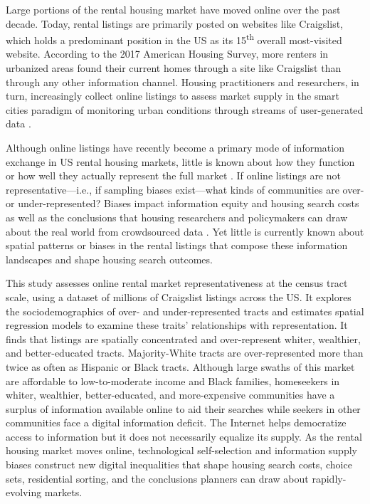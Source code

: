 \documentclass[11pt,letterpaper]{article}
\begin{document}
Large portions of the rental housing market have moved online over the past decade. Today, rental listings are primarily posted on websites like Craigslist, which holds a predominant position in the US as its 15\textsuperscript{th} overall most-visited website. According to the 2017 American Housing Survey, more renters in urbanized areas found their current homes through a site like Craigslist than through any other information channel. Housing practitioners and researchers, in turn, increasingly collect online listings to assess market supply in the smart cities paradigm of monitoring urban conditions through streams of user-generated data \citep{boeing_spot_2019,hu_monitoring_2019}.

Although online listings have recently become a primary mode of information exchange in US rental housing markets, little is known about how they function or how well they actually represent the full market \citep{boeing_new_2017,schachter_immigration_2017,besbris_language_2018}. If online listings are not representative---i.e., if sampling biases exist---what kinds of communities are over- or under-represented? Biases impact information equity and housing search costs as well as the conclusions that housing researchers and policymakers can draw about the real world from crowdsourced data \citep{mclaughlin_data_2018,arribas-bel_use_2018,folch_fast_2018,narayanan_toward_2019}. Yet little is currently known about spatial patterns or biases in the rental listings that compose these information landscapes and shape housing search outcomes.

This study assesses online rental market representativeness at the census tract scale, using a dataset of millions of Craigslist listings across the US. It explores the sociodemographics of over- and under-represented tracts and estimates spatial regression models to examine these traits' relationships with representation. It finds that listings are spatially concentrated and over-represent whiter, wealthier, and better-educated tracts. Majority-White tracts are over-represented more than twice as often as Hispanic or Black tracts. Although large swaths of this market are affordable to low-to-moderate income and Black families, homeseekers in whiter, wealthier, better-educated, and more-expensive communities have a surplus of information available online to aid their searches while seekers in other communities face a digital information deficit. The Internet helps democratize access to information but it does not necessarily equalize its supply. As the rental housing market moves online, technological self-selection and information supply biases construct new digital inequalities that shape housing search costs, choice sets, residential sorting, and the conclusions planners can draw about rapidly-evolving markets.
\end{document}

